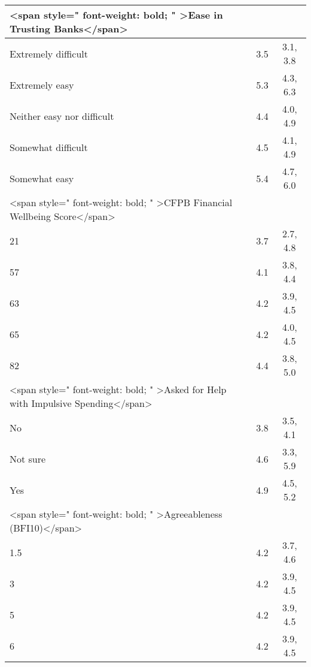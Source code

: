 \documentclass[border=1mm]{standalone}
\begin{document}
\begin{tabular}{l|c|c}
<span style=" font-weight: bold;    " >Ease in Trusting Banks</span> &  & \\
\hline
\hspace{1em}Extremely difficult & 3.5 & 3.1, 3.8\\
\hline
\hspace{1em}Extremely easy & 5.3 & 4.3, 6.3\\
\hline
\hspace{1em}Neither easy nor difficult & 4.4 & 4.0, 4.9\\
\hline
\hspace{1em}Somewhat difficult & 4.5 & 4.1, 4.9\\
\hline
\hspace{1em}Somewhat easy & 5.4 & 4.7, 6.0\\
\hline
<span style=" font-weight: bold;    " >CFPB Financial Wellbeing Score</span> &  & \\
\hline
\hspace{1em}21 & 3.7 & 2.7, 4.8\\
\hline
\hspace{1em}57 & 4.1 & 3.8, 4.4\\
\hline
\hspace{1em}6\hspace{1em}3 & 4.2 & 3.9, 4.5\\
\hline
\hspace{1em}65 & 4.2 & 4.0, 4.5\\
\hline
\hspace{1em}82 & 4.4 & 3.8, 5.0\\
\hline
<span style=" font-weight: bold;    " >Asked for Help with Impulsive Spending</span> &  & \\
\hline
\hspace{1em}No & 3.8 & 3.5, 4.1\\
\hline
\hspace{1em}Not sure & 4.6 & 3.3, 5.9\\
\hline
\hspace{1em}Yes & 4.9 & 4.5, 5.2\\
\hline
<span style=" font-weight: bold;    " >Agreeableness (BFI10)</span> &  & \\
\hline
\hspace{1em}1.5 & 4.2 & 3.7, 4.6\\
\hline
3 & 4.2 & 3.9, 4.5\\
\hline
\hspace{1em}5 & 4.2 & 3.9, 4.5\\
\hline
\hspace{1em}6 & 4.2 & 3.9, 4.5\\

\end{tabular}
\end{document}
